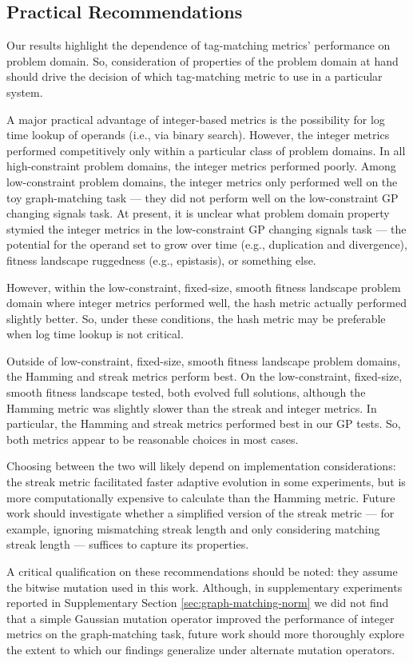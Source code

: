 \subsection{Practical Recommendations}

Our results highlight the dependence of tag-matching metrics' performance on  problem domain.
So, consideration of properties of the problem domain at hand should drive the decision of which tag-matching metric to use in a particular system.

A major practical advantage of integer-based metrics is the possibility for log time lookup of operands (i.e., via binary search).
However, the integer metrics performed competitively only within a particular class of problem domains.
In all high-constraint problem domains, the integer metrics performed poorly.
Among low-constraint problem domains, the integer metrics only performed well on the toy graph-matching task --- they did not perform well on the low-constraint GP changing signals task.
At present, it is unclear what problem domain property stymied the integer metrics in the low-constraint GP changing signals task --- the potential for the operand set to grow over time (e.g., duplication and divergence), fitness landscape ruggedness (e.g., epistasis), or something else.

However, within the low-constraint, fixed-size, smooth fitness landscape problem domain where integer metrics performed well, the hash metric actually performed slightly better.
So, under these conditions, the hash metric may be preferable when log time lookup is not critical.

Outside of low-constraint, fixed-size, smooth fitness landscape problem domains, the Hamming and streak metrics perform best.
On the low-constraint, fixed-size, smooth fitness landscape tested, both evolved full solutions, although the Hamming metric was slightly slower than the streak and integer metrics.
In particular, the Hamming and streak metrics performed best in our GP tests.
So, both metrics appear to be reasonable choices in most cases.

Choosing between the two will likely depend on implementation considerations: the streak metric facilitated faster adaptive evolution in some experiments, but is more computationally expensive to calculate than the Hamming metric.
Future work should investigate whether a simplified version of the streak metric --- for example, ignoring mismatching streak length and only considering matching streak length --- suffices to capture its properties.

A critical qualification on these recommendations should be noted: they assume the bitwise mutation used in this work.
Although, in supplementary experiments reported in Supplementary Section \ref{sec:graph-matching-norm} we did not find that a simple Gaussian mutation operator improved the performance of integer metrics on the graph-matching task, future work should more thoroughly explore the extent to which our findings generalize under alternate mutation operators.
